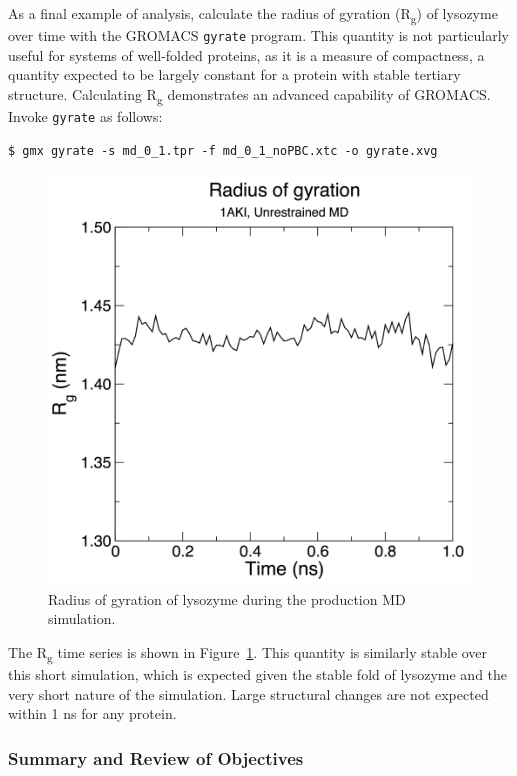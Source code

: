 \documentclass[9pt,tutorial,pubversion]{livecoms}
\begin{document}
As a final example of analysis, calculate the radius of gyration (R\textsubscript{g}) of lysozyme over time with the GROMACS \texttt{gyrate} program. This quantity is not particularly useful for systems of well-folded proteins, as it is a measure of compactness, a quantity expected to be largely constant for a protein with stable tertiary structure. Calculating R\textsubscript{g} demonstrates an advanced capability of GROMACS. Invoke \texttt{gyrate} as follows:

\begin{lstlisting}
$ gmx gyrate -s md_0_1.tpr -f md_0_1_noPBC.xtc -o gyrate.xvg
\end{lstlisting}

\begin{figure}[h]
\centering
\includegraphics{plot_lyso_md_rg}
\caption{Radius of gyration of lysozyme during the production MD simulation.}
\label{lyso_md_rg_fig}
\end{figure}

The R\textsubscript{g} time series is shown in Figure~\ref{lyso_md_rg_fig}. This quantity is similarly stable over this short simulation, which is expected given the stable fold of lysozyme and the very short nature of the simulation. Large structural changes are not expected within 1 ns for any protein.

\subsubsection{Summary and Review of Objectives} \label{lyso_summary}
\end{document}
